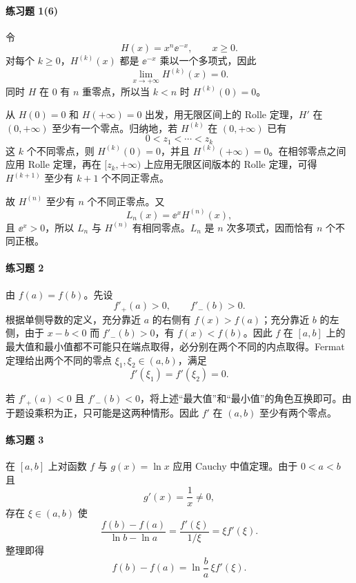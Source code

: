 \paragraph{练习题 1(6)}
\begin{xsolution}
令
\[
  H(x)=x^n\ee^{-x},\qquad x\geqslant0.
\]
对每个 $k\geqslant0$，$H^{(k)}(x)$ 都是 $\ee^{-x}$ 乘以一个多项式，因此
\[
  \lim_{x\to+\infty}H^{(k)}(x)=0.
\]
同时 $H$ 在 $0$ 有 $n$ 重零点，所以当 $k<n$ 时 $H^{(k)}(0)=0$。

从 $H(0)=0$ 和 $H(+\infty)=0$ 出发，用无限区间上的 Rolle 定理，$H'$ 在 $(0,+\infty)$ 至少有一个零点。归纳地，若 $H^{(k)}$ 在 $(0,+\infty)$ 已有
\[
  0<z_1<\cdots<z_k
\]
这 $k$ 个不同零点，则 $H^{(k)}(0)=0$，并且 $H^{(k)}(+\infty)=0$。在相邻零点之间应用 Rolle 定理，再在 $[z_k,+\infty)$ 上应用无限区间版本的 Rolle 定理，可得 $H^{(k+1)}$ 至少有 $k+1$ 个不同正零点。

故 $H^{(n)}$ 至少有 $n$ 个不同正零点。又
\[
  L_n(x)=\ee^x H^{(n)}(x),
\]
且 $\ee^x>0$，所以 $L_n$ 与 $H^{(n)}$ 有相同零点。$L_n$ 是 $n$ 次多项式，因而恰有 $n$ 个不同正根。
\end{xsolution}

\paragraph{练习题 2}
\begin{xsolution}
由 $f(a)=f(b)$。先设
\[
  f'_+(a)>0,\qquad f'_-(b)>0.
\]
根据单侧导数的定义，充分靠近 $a$ 的右侧有 $f(x)>f(a)$；充分靠近 $b$ 的左侧，由于 $x-b<0$ 而 $f'_-(b)>0$，有 $f(x)<f(b)$。因此 $f$ 在 $[a,b]$ 上的最大值和最小值都不可能只在端点取得，必分别在两个不同的内点取得。Fermat 定理给出两个不同的零点 $\xi_1,\xi_2\in(a,b)$，满足
\[
  f'(\xi_1)=f'(\xi_2)=0.
\]

若 $f'_+(a)<0$ 且 $f'_-(b)<0$，将上述“最大值”和“最小值”的角色互换即可。由于题设乘积为正，只可能是这两种情形。因此 $f'$ 在 $(a,b)$ 至少有两个零点。
\end{xsolution}

\paragraph{练习题 3}
\begin{xsolution}
在 $[a,b]$ 上对函数 $f$ 与 $g(x)=\ln x$ 应用 Cauchy 中值定理。由于 $0<a<b$ 且
\[
  g'(x)=\frac1x\neq0,
\]
存在 $\xi\in(a,b)$ 使
\[
  \frac{f(b)-f(a)}{\ln b-\ln a}
  =\frac{f'(\xi)}{1/\xi}=\xi f'(\xi).
\]
整理即得
\[
  f(b)-f(a)=\ln\frac ba\,\xi f'(\xi).
\]
\end{xsolution}

